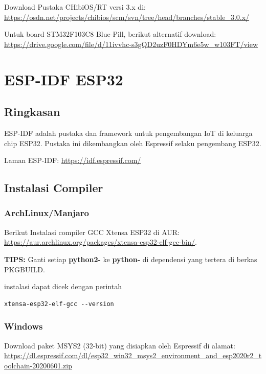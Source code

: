 \documentclass[12pt]{book}
\begin{document}
	Download Pustaka CHibiOS/RT versi 3.x di: \url{https://osdn.net/projects/chibios/scm/svn/tree/head/branches/stable_3.0.x/}
	
	Untuk board STM32F103C8 Blue-Pill, berikut alternatif download: \url{https://drive.google.com/file/d/11ivvhc-s3gQD2uzF0HDYm6e5w_w103FT/view}
	
	
	\chapter{ESP-IDF ESP32}
	
	\section{Ringkasan}
	
	ESP-IDF adalah pustaka dan framework untuk pengembangan IoT di keluarga chip ESP32.
	Pustaka ini dikembangkan oleh Espressif selaku pengembang ESP32.
	
	Laman ESP-IDF: \url{https://idf.espressif.com/}
	
	\section{Instalasi Compiler}
	
	\subsection{ArchLinux/Manjaro}
	
	Berikut Instalasi compiler GCC Xtensa ESP32 di AUR: \url{https://aur.archlinux.org/packages/xtensa-esp32-elf-gcc-bin/}.
	
	\textbf{TIPS:} Ganti setiap \textbf{python2-} ke \textbf{python-} di dependensi yang tertera di berkas PKGBUILD.
	
	instalasi dapat dicek dengan perintah
	\begin{verbatim}
xtensa-esp32-elf-gcc --version
	\end{verbatim}
	
	\subsection{Windows}
	
	Download paket MSYS2 (32-bit) yang disiapkan oleh Espressif di alamat: \url{https://dl.espressif.com/dl/esp32_win32_msys2_environment_and_esp2020r2_toolchain-20200601.zip}
	
\end{document}
